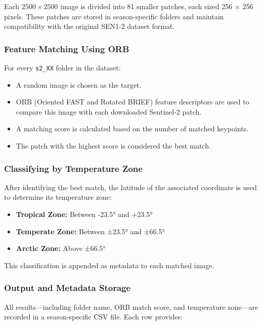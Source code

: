 Each $2500\times2500$ image is divided into 81 smaller patches, each sized 256 × 256 pixels. These patches are stored in season-specific folders and maintain compatibility with the original SEN1-2 dataset format.

\subsubsection{Feature Matching Using ORB}

For every \texttt{s2\_XX} folder in the dataset:

\begin{itemize}
    \item A random image is chosen as the target.
    \item ORB (Oriented FAST and Rotated BRIEF) feature descriptors are used to compare this image with each downloaded Sentinel-2 patch.
    \item A matching score is calculated based on the number of matched keypoints.
    \item The patch with the highest score is considered the best match.
\end{itemize}

\subsubsection{Classifying by Temperature Zone}

After identifying the best match, the latitude of the associated coordinate is used to determine its temperature zone:

\begin{itemize}
    \item \textbf{Tropical Zone:} Between -23.5° and +23.5°
    \item \textbf{Temperate Zone:} Between ±23.5° and ±66.5°
    \item \textbf{Arctic Zone:} Above ±66.5°
\end{itemize}

This classification is appended as metadata to each matched image.

\subsubsection{Output and Metadata Storage}

All results—including folder name, ORB match score, and temperature zone—are recorded in a season-specific CSV file. Each row provides:

